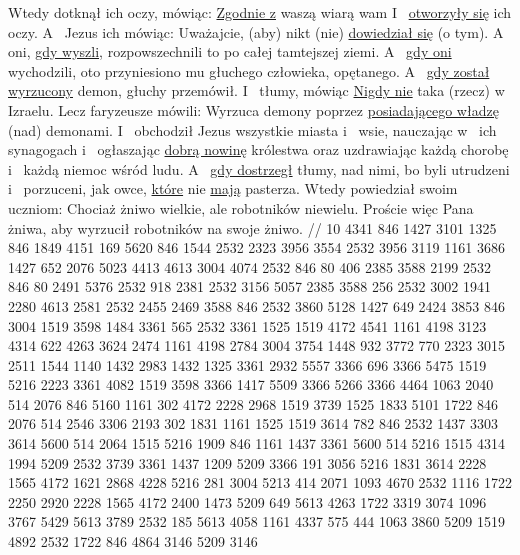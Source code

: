  Wtedy dotknął ich oczy, mówiąc: \underline{Zgodnie z} waszą wiarą  wam 
 I~ \underline{otworzyły się} ich oczy. A~ Jezus ich  mówiąc: Uważajcie, (aby) nikt (nie) \underline{dowiedział się} (o tym).
 A~ oni, \underline{gdy wyszli,} rozpowszechnili to po całej tamtejszej ziemi.
 A~ \underline{gdy oni} wychodzili, oto przyniesiono mu głuchego człowieka, opętanego.
 A~ \underline{gdy został wyrzucony} demon, głuchy przemówił. I~  tłumy, mówiąc \underline{Nigdy nie}  taka (rzecz) w~ Izraelu.
 Lecz faryzeusze mówili: Wyrzuca demony poprzez \underline{posiadającego władzę} (nad) demonami.
 I~ obchodził Jezus wszystkie miasta i~ wsie, nauczając w~ ich synagogach i~ ogłaszając \underline{dobrą nowinę} królestwa oraz uzdrawiając każdą chorobę i~ każdą niemoc wśród ludu.
 A~ \underline{gdy dostrzegł} tłumy,  nad nimi, bo byli utrudzeni i~ porzuceni, jak owce, \underline{które} nie \underline{mają} pasterza.
 Wtedy powiedział swoim uczniom: Chociaż żniwo wielkie, ale robotników niewielu.
 Proście więc Pana żniwa, aby wyrzucił robotników na swoje żniwo.
//
\endgl
\begingl
\lettrine[loversize=1,lraise=-1.3]{10 }{}%
 4341 846 1427 3101 1325 846 1849 4151 169 5620 846 1544 2532 2323 3956 3554 2532 3956 3119
{} 1161 3686 1427 652 2076 5023 4413 4613 3004 4074 2532 846 80 406 2385 3588 {} 2199 2532 846 80 2491
{} 5376 2532 918 2381 2532 3156 5057 2385 3588 {} 256 2532 3002 1941 2280
{} 4613 2581 2532 2455 2469 3588 846 2532 3860
{} 5128 1427 649 2424 {} 3853 846 3004 1519 3598 1484 3361 565 2532 3361 1525 1519 4172 4541
{} 1161 4198 3123 4314 622 4263 3624 2474
{} 1161 4198 2784 3004 3754 1448 932 3772
{} 770 2323 3015 2511 1544 1140 1432 2983 1432 1325
{} 3361 2932 5557 3366 696 3366 5475 1519 5216 2223
{} 3361 4082 1519 3598 3366 1417 5509 3366 5266 3366 4464 1063 2040 514 2076 846 5160
{} 1161 302 {} 4172 2228 2968 1519 3739 1525 1833 5101 1722 846 2076 514 2546 3306 2193 302 1831
{} 1161 1525 1519 3614 782 846
{} 2532 1437 3303 3614 5600 514 2064 1515 5216 1909 846 1161 1437 3361 5600 514 5216 1515 4314 1994 5209
{} 2532 3739 3361 1437 1209 5209 3366 {} 191 3056 5216 1831 3614 2228 {} 1565 4172 1621 2868 {} 4228 5216
{} 281 3004 5213 414 2071 1093 4670 2532 1116 1722 2250 2920 2228 1565 4172
{} 2400 1473 5209 649 5613 4263 1722 3319 3074 1096 3767 5429 5613 3789 2532 185 5613 4058
{} 1161 4337 575 444 1063 3860 5209 1519 4892 2532 1722 846 4864 3146 5209 3146
